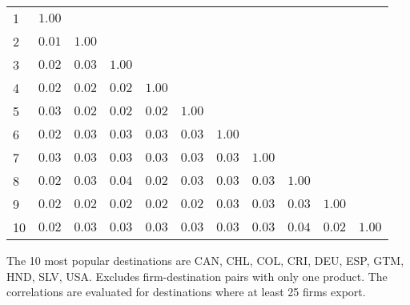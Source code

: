 \documentclass{article}
\begin{document}
\begin{table}[h]
{\begin{threeparttable}
\begin{tabular}{lrrrrrrrrrr}
\cmidrule{2-11} 
1  & $1.00$    &              &             &             &              &            &               &            &              &                        \\  
2  & $0.01$    & $1.00$     &             &             &              &            &               &            &              &                        \\  
3  & $0.02$    & $0.03$     & $1.00$    &             &              &            &               &            &              &                        \\  
4  & $0.02$    & $0.02$     & $0.02$    &  $1.00$   &              &            &               &            &              &                        \\  
5  & $0.03$    & $0.02$     & $0.02$    &  $0.02$   & $1.00$     &            &               &            &              &                        \\  
6  & $0.02$    & $0.03$     & $0.03$    &  $0.03$   & $0.03$     &  $1.00$  &               &            &              &                        \\  
7  & $0.03$    & $0.03$     & $0.03$    &  $0.03$   & $0.03$     &  $0.03$  &  $1.00$     &            &              &                        \\  
8  & $0.02$    & $0.03$     & $0.04$    &  $0.02$   & $0.03$     &  $0.03$  &  $0.03$     & $1.00$   &              &                        \\  
9  & $0.02$    & $0.02$     & $0.02$    &  $0.02$   & $0.02$     &  $0.03$  &  $0.03$     & $0.03$   & $1.00$     &                        \\  
10 & $0.02$   & $0.03$    & $0.03$   &  $0.03$  & $0.03$    &  $0.03$ &  $0.03$    & $0.04$  & $0.02$    &   $1.00$           \\  
\hline
\hline
\end{tabular}
\begin{tablenotes}
\small
\item  \noindent  \footnotesize{The 10 most popular destinations are CAN, CHL, COL, CRI, DEU, ESP, GTM, HND, SLV, USA. Excludes firm-destination pairs with only one product. The correlations are evaluated for destinations where at least 25 firms export.}
\end{tablenotes}
\end{threeparttable}
}
\end{table}
\end{document}

